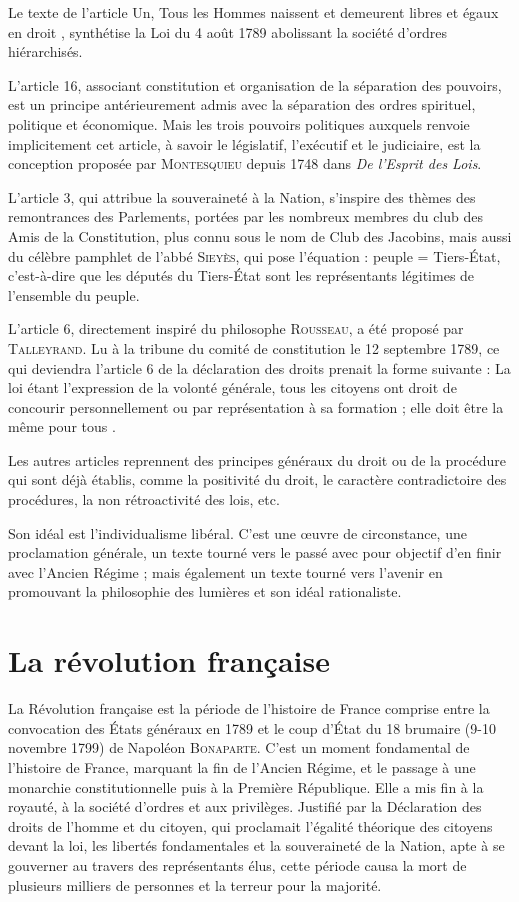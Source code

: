 \documentclass{book}
\begin{document}
Le texte de l’article Un, \og Tous les Hommes naissent et demeurent libres et égaux en droit \fg, synthétise la Loi du 4 août 1789 abolissant la société d’ordres hiérarchisés.

L’article 16, associant constitution et organisation de la séparation des pouvoirs, est un principe antérieurement admis avec la séparation des ordres spirituel, politique et économique. Mais les trois pouvoirs politiques auxquels renvoie implicitement cet article, à savoir le législatif, l’exécutif et le judiciaire, est la conception proposée par \textsc{Montesquieu} depuis 1748 dans \emph{De l’Esprit des Lois}.

L’article 3, qui attribue la souveraineté à la Nation, s’inspire des thèmes des remontrances des Parlements, portées par les nombreux membres du club des Amis de la Constitution, plus connu sous le nom de Club des Jacobins, mais aussi du célèbre pamphlet de l’abbé \textsc{Sieyès}, qui pose l’équation : peuple = Tiers-État, c’est-à-dire que les députés du Tiers-État sont les représentants légitimes de l’ensemble du peuple.

L’article 6, directement inspiré du philosophe \textsc{Rousseau}, a été proposé par \textsc{Talleyrand}. Lu à la tribune du comité de constitution le 12 septembre 1789, ce qui deviendra l’article 6 de la déclaration des droits prenait la forme suivante : \og La loi étant l’expression de la volonté générale, tous les citoyens ont droit de concourir personnellement ou par représentation à sa formation ; elle doit être la même pour tous \fg.

Les autres articles reprennent des principes généraux du droit ou de la procédure qui sont déjà établis, comme la positivité du droit, le caractère contradictoire des procédures, la non rétroactivité des lois, etc.

Son idéal est l’individualisme libéral. C’est une \oe uvre de circonstance, une proclamation générale, un texte tourné vers le passé avec pour objectif d’en finir avec l’Ancien Régime ; mais également un texte tourné vers l’avenir en promouvant la philosophie des lumières et son idéal rationaliste.

\appendix					%
\chapter{La révolution française}

La Révolution française est la période de l’histoire de France comprise entre la convocation des États généraux en 1789 et le coup d’État du 18 brumaire (9-10 novembre 1799) de Napoléon \textsc{Bonaparte}. C’est un moment fondamental de l’histoire de France, marquant la fin de l’Ancien Régime, et le passage à une monarchie constitutionnelle puis à la Première République. Elle a mis fin à la royauté, à la société d’ordres et aux privilèges. Justifié par la Déclaration des droits de l’homme et du citoyen, qui proclamait l’égalité théorique des citoyens devant la loi, les libertés fondamentales et la souveraineté de la Nation, apte à se gouverner au travers des représentants élus, cette période causa la mort de plusieurs milliers de personnes et la terreur pour la majorité.
\end{document}
